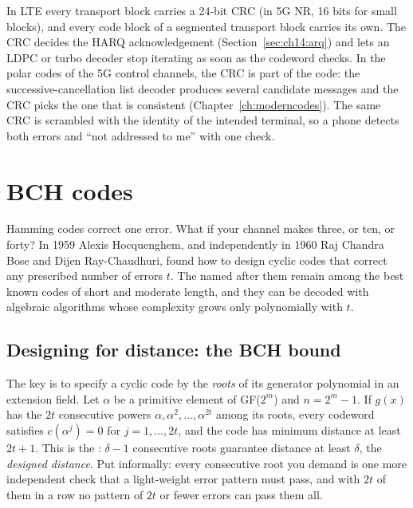 \begin{inpractice}
In LTE every transport block carries a 24-bit CRC (in 5G NR, 16 bits for small blocks), and every
code block of a segmented transport block carries its own. The CRC decides the HARQ acknowledgement
(Section~\ref{sec:ch14:arq}) and lets an LDPC or turbo decoder stop iterating as soon as the
codeword checks. In the polar codes of the 5G control channels, the CRC is part of the code: the
successive-cancellation list decoder produces several candidate messages and the CRC picks the
one that is consistent (Chapter~\ref{ch:moderncodes}). The same CRC is scrambled with the
identity of the intended terminal, so a phone detects both errors and ``not addressed to me'' with
one check.
\end{inpractice}

\section{BCH codes}
\label{sec:ch14:bch}

Hamming codes correct one error. What if your channel makes three, or ten, or forty? In 1959 Alexis
Hocquenghem, and independently in 1960 Raj Chandra Bose and Dijen Ray-Chaudhuri, found how to design
cyclic codes that correct any prescribed number of errors $t$. The  named after them
remain among the best known codes of short and moderate length, and they can be decoded with
algebraic algorithms whose complexity grows only polynomially with $t$.


\subsection{Designing for distance: the BCH bound}

The key is to specify a cyclic code by the \emph{roots} of its generator polynomial in an
extension field. Let $\alpha$ be a primitive element of GF($2^m$) and $n=2^m-1$. If $g(x)$ has the
$2t$ consecutive powers $\alpha,\alpha^2,\dots,\alpha^{2t}$ among its roots, every codeword
satisfies $c(\alpha^j)=0$ for $j=1,\dots,2t$, and the code has minimum distance at least $2t+1$.
This is the : $\delta-1$ consecutive roots guarantee distance at least $\delta$, the
\emph{designed distance}. Put informally: every consecutive root you demand is one more
independent check that a light-weight error pattern must pass, and with $2t$ of them in a row no
pattern of $2t$ or fewer errors can pass them all.

